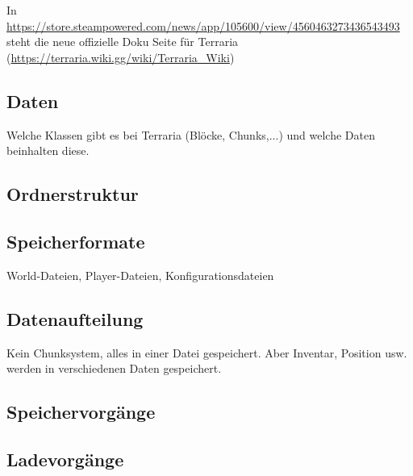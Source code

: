 In \url{https://store.steampowered.com/news/app/105600/view/4560463273436543493} steht die neue offizielle Doku Seite für Terraria (\url{https://terraria.wiki.gg/wiki/Terraria_Wiki})


\subsection{Daten}
Welche Klassen gibt es bei Terraria (Blöcke, Chunks,...) und welche Daten 
beinhalten diese.

\subsection{Ordnerstruktur}

\subsection{Speicherformate}
World-Dateien, Player-Dateien, Konfigurationsdateien 

\subsection{Datenaufteilung}
Kein Chunksystem, alles in einer Datei gespeichert. Aber Inventar, Position
usw. werden in verschiedenen Daten gespeichert.

\subsection{Speichervorgänge}

\subsection{Ladevorgänge} 

